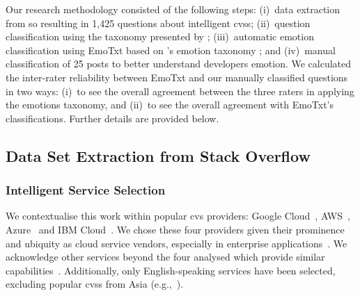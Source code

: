 Our research methodology consisted of the following steps: (i)~data extraction from \gls{so} resulting in 1,425 questions about intelligent \glspl{cvs}; (ii)~question classification using the taxonomy presented by \citet{Beyer:2018fm}; (iii)~automatic emotion classification using EmoTxt based on \citeauthor{shaver1987}'s emotion taxonomy \citep{shaver1987}; and (iv)~manual classification of 25 posts to better understand developers emotion. We calculated the inter-rater reliability between EmoTxt and our manually classified questions in two ways: (i)~to see the overall agreement between the three raters in applying the \citeauthor{shaver1987} emotions taxonomy, and (ii)~to see the overall agreement with EmoTxt's classifications. Further details are provided below.

\def \alexnumauthor {second}

\subsection{Data Set Extraction from Stack Overflow}

\subsubsection{Intelligent Service Selection}

We contextualise this work within popular \gls{cvs} providers: Google Cloud~, AWS~, Azure~ and IBM Cloud~.
We chose these four providers given their prominence and ubiquity as cloud service vendors, especially in enterprise applications~\citep{RightScaleInc:2018kJ}. We acknowledge other services beyond the four analysed which provide similar capabilities~. Additionally, only English-speaking services have been selected, excluding popular \glspl{cvs} from Asia (e.g.,~).


